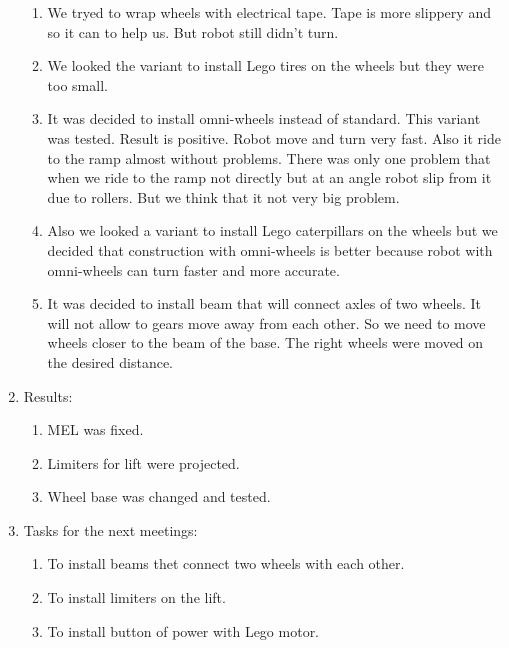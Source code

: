 \begin{enumerate}
\begin{enumerate}
		\item We tryed to wrap wheels with electrical tape. Tape is more slippery and so it can to help us. But robot still didn't turn.
		
		\item We looked the variant to install Lego tires on the wheels but they were too small.
		
		\item It was decided to install omni-wheels instead of standard. This variant was tested. Result is positive. Robot move and turn very fast. Also it ride to the ramp almost without problems. There was only one problem that when we ride to the ramp not directly but at an angle robot slip from it due to rollers. But we think that it not very big problem.
		
		\item Also we looked a variant to install Lego caterpillars on the wheels but we decided that construction with omni-wheels is better because robot with omni-wheels can turn faster and more accurate.
		
		\item It was decided to install beam that will connect axles of two wheels. It will not allow to gears move away from each other. So we need to move wheels closer to the beam of the base. The right wheels were moved on the desired distance.  
		
	\end{enumerate}
	
	\item Results:
	\begin{enumerate}
		
		\item MEL was fixed. 
		
		\item Limiters for lift were projected.
		
		\item Wheel base was changed and tested.
		
	\end{enumerate}
	
	\item Tasks for the next meetings:
	\begin{enumerate}
		
		\item To install beams thet connect two wheels with each other.
		
		\item To install limiters on the lift.
		
		\item To install button of power with Lego motor.
		
	\end{enumerate}
\end{enumerate}
\fillpage

